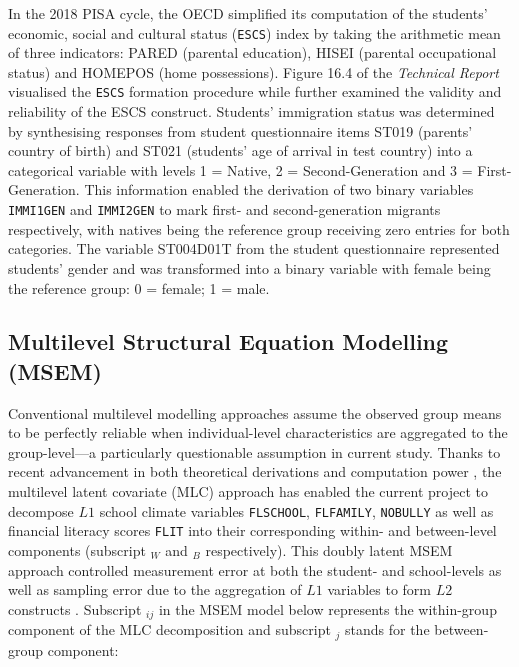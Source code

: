 In the 2018 PISA cycle, the OECD simplified its computation of the students' economic, social and cultural status (\texttt{ESCS}) index by taking the arithmetic mean of three indicators: \textsf{PARED} (parental education), \textsf{HISEI} (parental occupational status) and \textsf{HOMEPOS} (home possessions). Figure 16.4 of the \textit{Technical Report} \citep{PISAtech} visualised the \texttt{ESCS} formation procedure while \citet{avvisati:2020} further examined the validity and reliability of the ESCS construct. Students' immigration status was determined by synthesising responses from student questionnaire items \textsf{ST019} (parents' country of birth) and \textsf{ST021} (students' age of arrival in test country) \citep[][pp. 212--213]{PISAvol3} into a categorical variable with levels \textsf{1 = Native}, \textsf{2 = Second-Generation} and \textsf{3 = First-Generation}. This information enabled the derivation of two binary variables \texttt{IMMI1GEN} and \texttt{IMMI2GEN} to mark first- and second-generation migrants respectively, with natives being the reference group receiving zero entries for both categories. The variable \textsf{ST004D01T} from the student questionnaire \citep{FLdata} represented students' gender and was transformed into a binary variable with female being the reference group: \textsf{0 = female}; \textsf{1 = male}.

\subsection{Multilevel Structural Equation Modelling (MSEM)}

Conventional multilevel modelling approaches assume the observed group means to be perfectly reliable when individual-level characteristics are aggregated to the group-level---a particularly questionable assumption in current study. Thanks to recent advancement in both theoretical derivations \citep{ludtke:2008, marsh:2009} and computation power \citep{mplus}, the multilevel latent covariate (MLC) approach has enabled the current project to decompose $L1$ school climate variables \texttt{FLSCHOOL}, \texttt{FLFAMILY}, \texttt{NOBULLY} as well as financial literacy scores \texttt{FLIT} into their corresponding within- and between-level components (subscript $_W$ and $_B$ respectively). This doubly latent MSEM approach controlled measurement error at both the student- and school-levels as well as sampling error due to the aggregation of $L1$ variables to form $L2$ constructs \citep{ludtke:2009, ludtke:2011, marsh:2012}. Subscript $_{ij}$ in the MSEM model below represents the within-group component of the MLC decomposition and subscript $_j$ stands for the between-group component:

